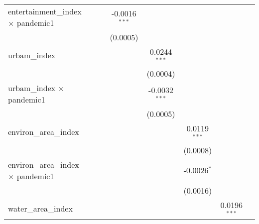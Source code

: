 \begin{table}[htbp]
\begin{threeparttable}[b]
\begin{tabular}{lccccccc}
         entertainment\_index $\times$ pandemic1    &                         &                         & -0.0016$^{***}$         &                        &                         &                         &   \\   
                                                    &                         &                         & (0.0005)                &                        &                         &                         &   \\   
         urbam\_index                               &                         &                         &                         & 0.0244$^{***}$         &                         &                         &   \\   
                                                    &                         &                         &                         & (0.0004)               &                         &                         &   \\   
         urbam\_index $\times$ pandemic1            &                         &                         &                         & -0.0032$^{***}$        &                         &                         &   \\   
                                                    &                         &                         &                         & (0.0005)               &                         &                         &   \\   
         environ\_area\_index                       &                         &                         &                         &                        & 0.0119$^{***}$          &                         &   \\   
                                                    &                         &                         &                         &                        & (0.0008)                &                         &   \\   
         environ\_area\_index $\times$ pandemic1    &                         &                         &                         &                        & -0.0026$^{*}$           &                         &   \\   
                                                    &                         &                         &                         &                        & (0.0016)                &                         &   \\   
         water\_area\_index                         &                         &                         &                         &                        &                         & 0.0196$^{***}$          &   \\   

\end{tabular}
\end{threeparttable}
\end{table}
